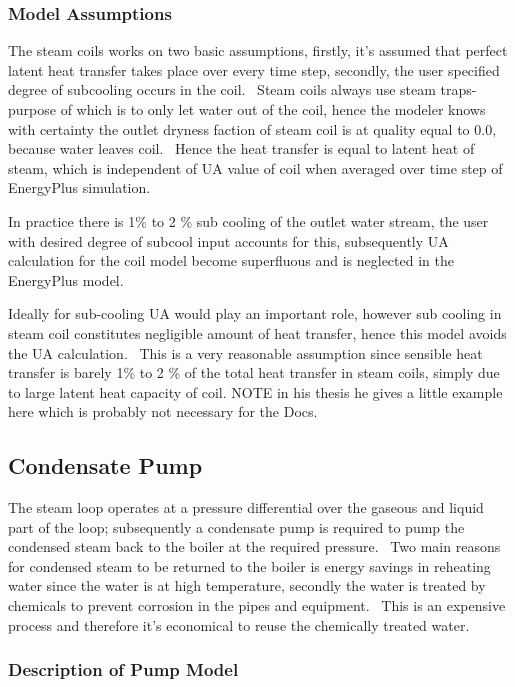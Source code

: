 \subsubsection{Model Assumptions}\label{model-assumptions-001}

The steam coils works on two basic assumptions, firstly, it's assumed that perfect latent heat transfer takes place over every time step, secondly, the user specified degree of subcooling occurs in the coil.~ Steam coils always use steam traps- purpose of which is to only let water out of the coil, hence the modeler knows with certainty the outlet dryness faction of steam coil is at quality equal to 0.0, because water leaves coil.~ Hence the heat transfer is equal to latent heat of steam, which is independent of UA value of coil when averaged over time step of EnergyPlus simulation.

In practice there is 1\% to 2 \% sub cooling of the outlet water stream, the user with desired degree of subcool input accounts for this, subsequently UA calculation for the coil model become superfluous and is neglected in the EnergyPlus model.

Ideally for sub-cooling UA would play an important role, however sub cooling in steam coil constitutes negligible amount of heat transfer, hence this model avoids the UA calculation.~ This is a very reasonable assumption since sensible heat transfer is barely 1\% to 2 \% of the total heat transfer in steam coils, simply due to large latent heat capacity of coil. NOTE in his thesis he gives a little example here which is probably not necessary for the Docs.

\subsection{Condensate Pump}\label{condensate-pump}

The steam loop operates at a pressure differential over the gaseous and liquid part of the loop; subsequently a condensate pump is required to pump the condensed steam back to the boiler at the required pressure.~ Two main reasons for condensed steam to be returned to the boiler is energy savings in reheating water since the water is at high temperature, secondly the water is treated by chemicals to prevent corrosion in the pipes and equipment.~ This is an expensive process and therefore it's economical to reuse the chemically treated water.

\subsubsection{Description of Pump Model}\label{description-of-pump-model}

